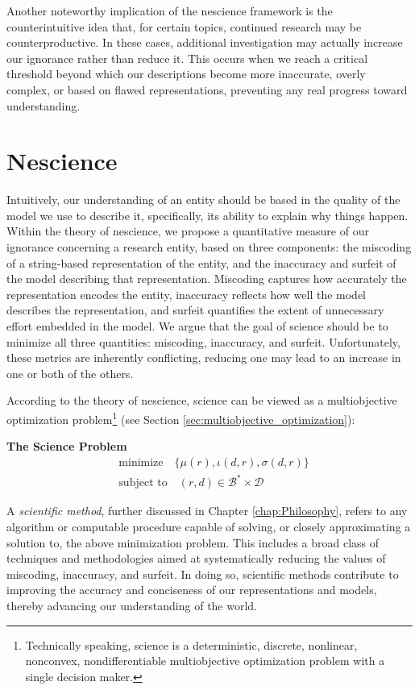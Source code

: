 Another noteworthy implication of the nescience framework is the counterintuitive idea that, for certain topics, continued research may be counterproductive. In these cases, additional investigation may actually increase our ignorance rather than reduce it. This occurs when we reach a critical threshold beyond which our descriptions become more inaccurate, overly complex, or based on flawed representations, preventing any real progress toward understanding. 

%
%

\section{Nescience}

Intuitively, our understanding of an entity should be based in the quality of the model we use to describe it, specifically, its ability to explain why things happen. Within the theory of nescience, we propose a quantitative measure of our ignorance concerning a research entity, based on three components: the miscoding of a string-based representation of the entity, and the inaccuracy and surfeit of the model describing that representation. Miscoding captures how accurately the representation encodes the entity, inaccuracy reflects how well the model describes the representation, and surfeit quantifies the extent of unnecessary effort embedded in the model. We argue that the goal of science should be to minimize all three quantities: miscoding, inaccuracy, and surfeit. Unfortunately, these metrics are inherently conflicting, reducing one may lead to an increase in one or both of the others.

According to the theory of nescience, science can be viewed as a multiobjective optimization problem\footnote{Technically speaking, science is a deterministic, discrete, nonlinear, nonconvex, nondifferentiable multiobjective optimization problem with a single decision maker.} (see Section \ref{sec:multiobjective_optimization}):

\begin{tBox}
\textbf{The Science Problem}
\begin{align*}
 & \text{minimize} \quad \{ \mu(r), \iota(d, r), \sigma(d, r)\} \\
 & \text{subject to} \quad (r, d) \in \mathcal{B}^\ast \times \mathcal{D}
\end{align*}
\end{tBox}

A \emph{scientific method}, further discussed in Chapter \ref{chap:Philosophy}, refers to any algorithm or computable procedure capable of solving, or closely approximating a solution to, the above minimization problem. This includes a broad class of techniques and methodologies aimed at systematically reducing the values of miscoding, inaccuracy, and surfeit. In doing so, scientific methods contribute to improving the accuracy and conciseness of our representations and models, thereby advancing our understanding of the world.

